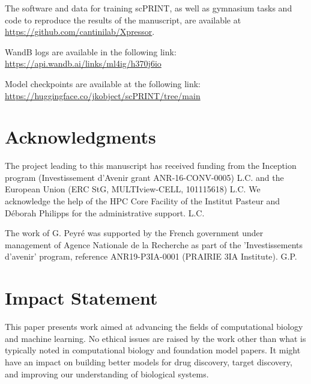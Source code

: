 The software and data for training scPRINT, as well as gymnasium tasks and code to reproduce the results of the manuscript, are available at \url{https://github.com/cantinilab/Xpressor}.

WandB logs are available in the following link:
\url{https://api.wandb.ai/links/ml4ig/h370j6io}

Model checkpoints are available at the following link:
\url{https://huggingface.co/jkobject/scPRINT/tree/main}



\section*{Acknowledgments}

The project leading to this manuscript has received funding from the Inception program (Investissement d'Avenir grant ANR-16-CONV-0005) L.C. and the European Union (ERC StG, MULTIview-CELL, 101115618) L.C. We acknowledge the help of the HPC Core Facility of the Institut Pasteur and Déborah Philipps for the administrative support. L.C.

The work of G. Peyré was supported by the French government under management of Agence Nationale de la Recherche as part of the 'Investissements d'avenir' program, reference ANR19-P3IA-0001 (PRAIRIE 3IA Institute). G.P.

\section*{Impact Statement}

This paper presents work aimed at advancing the fields of computational biology and machine learning. No ethical issues are raised by the work other than what is typically noted in computational biology and foundation model papers. It might have an impact on building better models for drug discovery, target discovery, and improving our understanding of biological systems.
